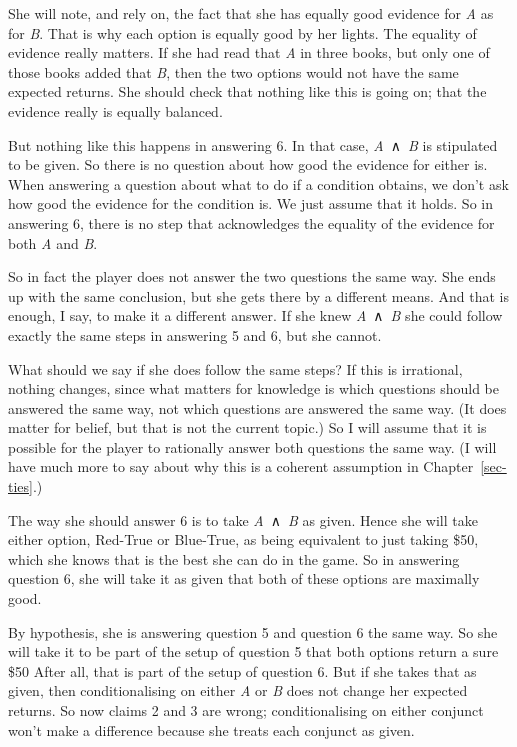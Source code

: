 \documentclass[
  10pt,
  letterpaper,
  twoside]{scrbook}
\begin{document}
She will note, and rely on, the fact that she has equally good evidence
for \emph{A} as for \emph{B}. That is why each option is equally good by
her lights. The equality of evidence really matters. If she had read
that \emph{A} in three books, but only one of those books added that
\emph{B}, then the two options would not have the same expected returns.
She should check that nothing like this is going on; that the evidence
really is equally balanced.

But nothing like this happens in answering 6. In that case,
\emph{A}~∧~\emph{B} is stipulated to be given. So there is no question
about how good the evidence for either is. When answering a question
about what to do if a condition obtains, we don't ask how good the
evidence for the condition is. We just assume that it holds. So in
answering 6, there is no step that acknowledges the equality of the
evidence for both \emph{A} and \emph{B}.

So in fact the player does not answer the two questions the same way.
She ends up with the same conclusion, but she gets there by a different
means. And that is enough, I say, to make it a different answer. If she
knew \emph{A}~∧~\emph{B} she could follow exactly the same steps in
answering 5 and 6, but she cannot.

What should we say if she does follow the same steps? If this is
irrational, nothing changes, since what matters for knowledge is which
questions should be answered the same way, not which questions are
answered the same way. (It does matter for belief, but that is not the
current topic.) So I will assume that it is possible for the player to
rationally answer both questions the same way. (I will have much more to
say about why this is a coherent assumption in Chapter~\ref{sec-ties}.)

The way she should answer 6 is to take \emph{A}~∧~\emph{B} as given.
Hence she will take either option, Red-True or Blue-True, as being
equivalent to just taking \$50, which she knows that is the best she can
do in the game. So in answering question 6, she will take it as given
that both of these options are maximally good.

By hypothesis, she is answering question 5 and question 6 the same way.
So she will take it to be part of the setup of question 5 that both
options return a sure \$50 After all, that is part of the setup of
question 6. But if she takes that as given, then conditionalising on
either \emph{A} or \emph{B} does not change her expected returns. So now
claims 2 and 3 are wrong; conditionalising on either conjunct won't make
a difference because she treats each conjunct as given.
\end{document}
